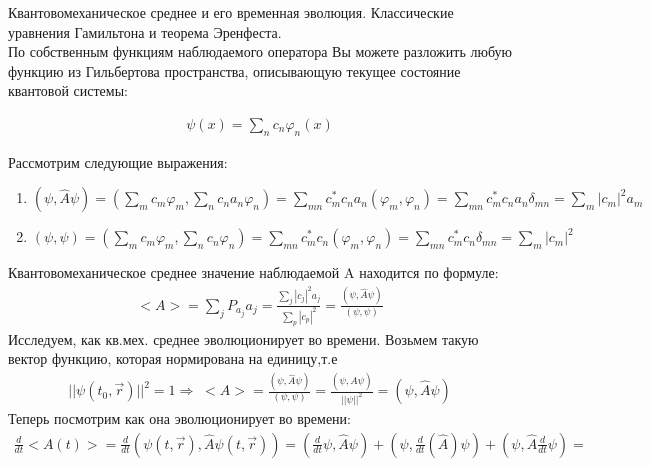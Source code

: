 \documentclass[__main__.tex]{subfiles}
\begin{document}
Квантовомеханическое среднее и его временная эволюция. Классические уравнения Гамильтона и теорема Эренфеста.\\ 

По собственным функциям наблюдаемого оператора Вы можете разложить любую функцию из Гильбертова пространства, описывающую текущее состояние квантовой системы:

\begin{gather*}
	\psi (x) = \sum_nc_n\varphi_n(x)
\end{gather*}

Рассмотрим следующие выражения:
\begin{enumerate}
	\item $(\psi,\hat A \psi) = \left(\sum_mc_m\varphi_m,\sum_nc_na_n\varphi_n\right) = \sum_{mn}c_m^*c_na_n(\varphi_m,\varphi_n) = \sum_{mn}c_m^*c_na_n\delta_{mn} = \sum_m|c_m|^2a_m $
	\item $(\psi,\psi) = \left(\sum_mc_m\varphi_m,\sum_nc_n\varphi_n\right) = \sum_{mn}c_m^*c_n(\varphi_m,\varphi_n) = \sum_{mn}c_m^*c_n\delta_{mn} = \sum_m|c_m|^2 $
\end{enumerate}

Квантовомеханическое среднее значение наблюдаемой A находится по формуле:
\begin{gather*}
	<A> = \sum_jP_{a_j}a_j = \frac{\sum_j|c_j|^2a_j}{\sum_p|c_p|^2} = \frac{(\psi,\hat{A}\psi)}{(\psi,\psi)}
\end{gather*}
Исследуем, как кв.мех. среднее эволюционирует во времени. Возьмем такую вектор функцию, которая нормирована на единицу,т.е
\begin{gather*}
	\vert\vert \psi(t_0,\vec{r})\vert\vert ^2 = 1 \Rightarrow\;  <A> = \frac{(\psi,\hat{A}\psi)}{(\psi,\psi)} = \frac{(\psi,\hat{A}\psi)}{\vert\vert\psi\vert\vert^2} = (\psi,\hat{A}\psi)
\end{gather*}
Теперь посмотрим как она эволюционирует во времени:
\begin{gather*}
	\frac{d}{dt}<A(t)> = \frac{d}{dt}\left(\psi(t,\vec{r}), \hat{A} \psi(t,\vec{r})\right) = \left(\frac{d}{dt}\psi,\hat{A}\psi\right)+\left(\psi,\frac{d}{dt}(\hat{A})\psi\right)+\left(\psi,\hat{A}\frac{d}{dt}\psi\right) = 
\end{gather*}
\end{document}
